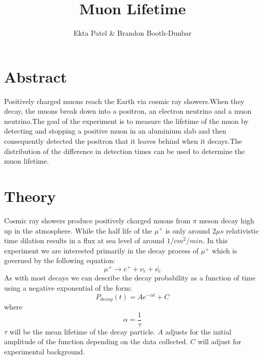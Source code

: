 
\newcommand{\ig}[2][width=4in]{\texttt{[image: \#2]}}    		
\usepackage{graphicx}					
\usepackage{amssymb}
\usepackage{pgfplotstable}
\usepackage{float}
\usepackage{caption}
\captionsetup[table]{justification=justified,singlelinecheck=false, position=bottom}


\header {\today}							
\title{Muon Lifetime}
\author{Ekta Patel \& Brandon Booth-Dunbar}

\section{Abstract}
\begin{em} Positively charged muons reach the Earth via cosmic ray showers.When they decay, the muons break down into a positron, an electron neutrino and a muon neutrino.The goal of the experiment is to measure the lifetime of the muon by detecting and stopping a positive muon in an aluminium slab and then consequently detected the positron that it leaves behind when it decays.The distribution of the difference in detection times can be used to determine the muon lifetime.
\end{em}

\section{Theory}
\indent \indent Cosmic ray showers produce positively charged muons from $\pi$ meson decay high up in the atmosphere. While the half life of the $\mu^+$ is only around 2$\mu s$ relativistic time dilation results in a flux at sea level of around $1/cm^2/min$.  In this experiment we are interested primarily in the decay process of $\mu^+$ which is governed by the following equation:
\begin{equation}
	\mu^+ \rightarrow e^+ + \nu_e + \bar{\nu_e}
\end{equation}
\indent \indent As with most decays we can describe the decay probability as a function of time using a negative exponential of the form:
\begin{equation}
P_{decay}(t) = A e^{-\alpha t} + C
\end{equation}
\indent \indent \indent \indent where 
\begin{equation}
\alpha = \frac{1}{\tau}
\end{equation}
$\tau$ will be the mean lifetime of the decay particle. $A$ adjusts for the initial amplitude of the function depending on the data collected. $C$ will adjust for experimental background. 

